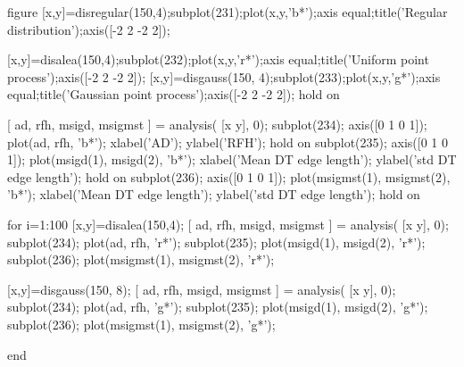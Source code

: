 \begin{matlab}
figure
[x,y]=disregular(150,4);subplot(231);plot(x,y,'b*');axis equal;title('Regular distribution');axis([-2 2 -2 2]);
 
[x,y]=disalea(150,4);subplot(232);plot(x,y,'r*');axis equal;title('Uniform point process');axis([-2 2 -2 2]);
[x,y]=disgauss(150, 4);subplot(233);plot(x,y,'g*');axis equal;title('Gaussian point process');axis([-2 2 -2 2]);
hold on

[ ad, rfh, msigd, msigmst ] = analysis( [x y], 0);
subplot(234);
axis([0 1 0 1]);
plot(ad, rfh, 'b*');  xlabel('AD'); ylabel('RFH'); hold on
subplot(235);
axis([0 1 0 1]);
plot(msigd(1), msigd(2), 'b*');  xlabel('Mean DT edge length'); ylabel('std DT edge length'); hold on
subplot(236);
axis([0 1 0 1]);
plot(msigmst(1), msigmst(2), 'b*');  xlabel('Mean DT edge length'); ylabel('std DT edge length'); hold on

for i=1:100
    [x,y]=disalea(150,4);
    [ ad, rfh, msigd, msigmst ] = analysis( [x y], 0);
    subplot(234);
    plot(ad, rfh, 'r*'); 
    subplot(235);
    plot(msigd(1), msigd(2), 'r*');
    subplot(236);
    plot(msigmst(1), msigmst(2), 'r*'); 
     
    [x,y]=disgauss(150, 8);   
    [ ad, rfh, msigd, msigmst ] = analysis( [x y], 0);
    subplot(234);
    plot(ad, rfh, 'g*');
    subplot(235);
    plot(msigd(1), msigd(2), 'g*'); 
    subplot(236);
    plot(msigmst(1), msigmst(2), 'g*'); 
    
end
\end{matlab}

